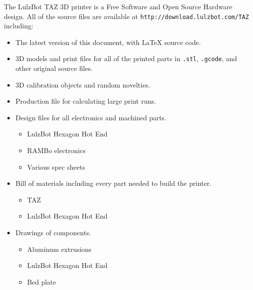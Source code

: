 %
%
%
%
%

The LulzBot\textsuperscript{\miniscule{\textregistered}} TAZ 3D printer is a Free Software and Open Source Hardware design. All of the source files are available at \texttt{http://download.lulzbot.com/TAZ} including:

\begin{itemize}
\item The latest version of this document, with {\LaTeX} source code.

\item 3D models and print files for all of the printed parts in \texttt{.stl}, \texttt{.gcode}, and other original source files.

\item 3D calibration objects and random novelties.

\item Production file for calculating large print runs.

\item Design files for all electronics and machined parts.

\begin{itemize} %
\item LulzBot\textsuperscript{\miniscule{\textregistered}} Hexagon Hot End
\item RAMBo electronics
\item Various spec sheets
\end{itemize} %

\item Bill of materials including every part needed to build the printer.
\begin{itemize} %
\item TAZ
\item LulzBot Hexagon Hot End
\end{itemize} %

\item Drawings of components.
\begin{itemize} %
\item Aluminum extrusions
\item LulzBot Hexagon Hot End
\item Bed plate
\end{itemize} %


\end{itemize}
